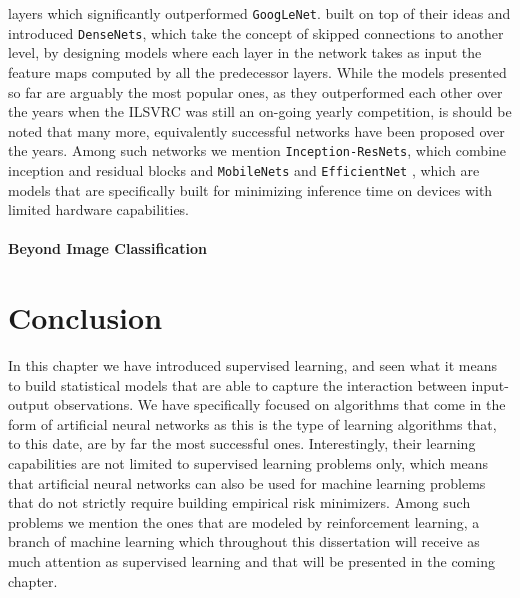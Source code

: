layers which significantly outperformed \texttt{GoogLeNet}. \citet{huang2017densely} built on top of their ideas and introduced \texttt{DenseNets}, which take the concept of skipped connections to another level, by designing models where each layer in the network takes as input the feature maps computed by all the predecessor layers. While the models presented so far are arguably the most popular ones, as they outperformed each other over the years when the ILSVRC was still an on-going yearly competition, is should be noted that many more, equivalently successful networks have been proposed over the years. Among such networks we mention \texttt{Inception-ResNets}, which combine inception and residual blocks \cite{szegedy2017inception} and \texttt{MobileNets} \cite{sandler2018mobilenetv2, howard2019searching} and \texttt{EfficientNet} \cite{tan2019efficientnet,}, which are models that are specifically built for minimizing inference time on devices with limited hardware capabilities. 

\paragraph{Beyond Image Classification}



\section{Conclusion}
\label{sec:conclusion01}
In this chapter we have introduced supervised learning, and seen what it means to build statistical models that are able to capture the interaction between input-output observations. We have specifically focused on algorithms that come in the form of artificial neural networks as this is the type of learning algorithms that, to this date, are by far the most successful ones. Interestingly, their learning capabilities are not limited to supervised learning problems only, which means that artificial neural networks can also be used for machine learning problems that do not strictly require building empirical risk minimizers. Among such problems we mention the ones that are modeled by reinforcement learning, a branch of machine learning which throughout this dissertation will receive as much attention as supervised learning and that will be presented in the coming chapter.
